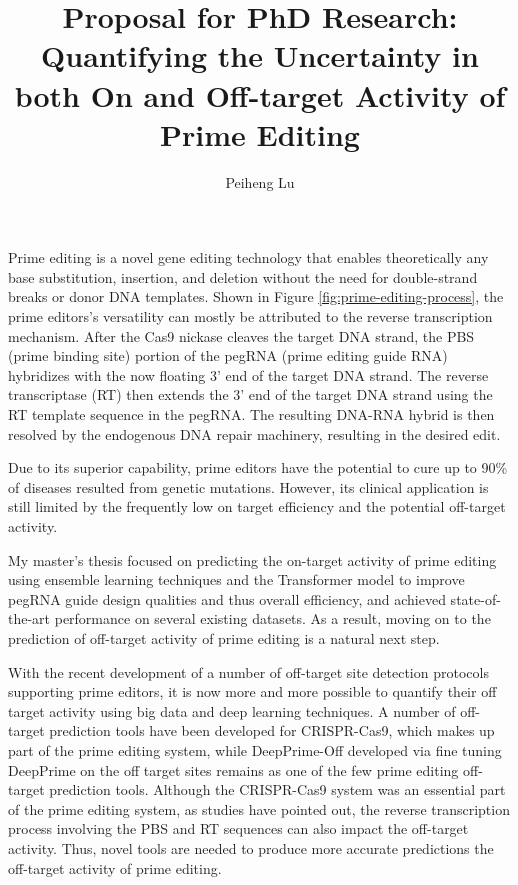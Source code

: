 \documentclass[a4,12pt]{article}
\title{Proposal for PhD Research: 
Quantifying the Uncertainty in both On and Off-target Activity of Prime Editing}
\author{Peiheng Lu}
\begin{document}
\maketitle

Prime editing is a novel gene editing technology that enables theoretically any base substitution, insertion, and deletion without the need for double-strand breaks or donor DNA templates\cite{liudavidr.SearchreplaceGenomeEditing2019,liuPrimeEditingPrecise2023}. Shown in Figure \ref{fig:prime-editing-process}, the prime editors's versatility can mostly be attributed to the reverse transcription mechanism. After the Cas9 nickase cleaves the target DNA strand, the PBS (prime binding site) portion of the pegRNA (prime editing guide RNA) hybridizes with the now floating 3' end of the target DNA strand. The reverse transcriptase (RT) then extends the 3' end of the target DNA strand using the RT template sequence in the pegRNA. The resulting DNA-RNA hybrid is then resolved by the endogenous DNA repair machinery, resulting in the desired edit.

Due to its superior capability, prime editors have the potential to cure up to 90\% of diseases resulted from genetic mutations. However, its clinical application is still limited by the frequently low on target efficiency and the potential off-target activity\cite{zhaoPrimeEditingAdvances2023}.

My master's thesis focused on predicting the on-target activity of prime editing using ensemble learning techniques and the Transformer model to improve pegRNA guide design qualities and thus overall efficiency, and achieved state-of-the-art performance on several existing datasets. As a result, moving on to the prediction of off-target activity of prime editing is a natural next step.

With the recent development of a number of off-target site detection protocols supporting prime editors, it is now more and more possible to quantify their off target activity using big data and deep learning techniques\parencite{liangGenomewideProfilingPrime2023,
zhuTrackingseqRevealsHeterogeneity2024}.
A number of off-target prediction tools have been developed for CRISPR-Cas9, which makes up part of the prime editing system, while DeepPrime-Off developed via fine tuning DeepPrime on the off target sites remains as one of the few prime editing off-target prediction tools. Although the CRISPR-Cas9 system was an essential part of the prime editing system, as studies have pointed out, the reverse transcription process involving the PBS and RT sequences can also impact the off-target activity. Thus, novel tools are needed to produce more accurate predictions the off-target activity of prime editing\parencite{liangGenomewideProfilingPrime2023,yuPredictionEfficienciesDiverse2023}.
\end{document}
